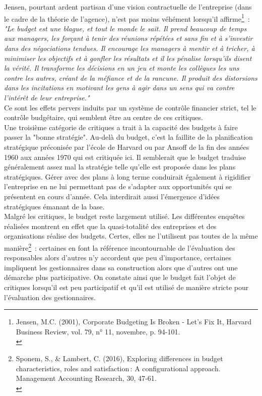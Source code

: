 \documentclass{kaobook}
\begin{document}
Jensen, pourtant ardent partisan d'une vision contractuelle de l'entreprise (dans le cadre de la théorie de l'agence), n'est pas moins véhément lorsqu'il affirme\footnote{Jensen, M.C. (2001), Corporate Budgeting Is Broken - Let's Fix It, Harvard Business Review, vol. 79, n° 11, novembre, p. 94-101.\\} :\\
\emph{"Le budget est une blague, et tout le monde le sait. Il prend beaucoup de temps aux managers, les forçant à tenir des réunions répétées et sans fin et à s'investir dans des négociations tendues. Il encourage les managers à mentir et à tricher, à minimiser les objectifs et à gonfler les résultats et il les pénalise lorsqu'ils disent la vérité. Il transforme les décisions en un jeu et monte les collègues les uns contre les autres, créant de la méfiance et de la rancune. Il produit des distorsions dans les incitations en motivant les gens à agir dans un sens qui va contre l'intérêt de leur entreprise."}\\
Ce sont les effets pervers induits par un système de contrôle financier strict, tel le contrôle budgétaire, qui semblent être au centre de ces critiques.\\

Une troisième catégorie de critiques a trait à la capacité des budgets à faire passer la "bonne stratégie". Au-delà du budget, c'est la faillite de la planification stratégique préconisée par l'école de Harvard ou par Ansoff de la fin des années 1960 aux années 1970 qui est critiquée ici. Il semblerait que le budget traduise généralement assez mal la stratégie telle qu'elle est proposée dans les plans stratégiques. Gérer avec des plans à long terme conduirait également à rigidifier l'entreprise en ne lui permettant pas de s'adapter aux opportunités qui se présentent en cours d'année. Cela interdirait aussi l'émergence d'idées stratégiques émanant de la base.\\

Malgré les critiques, le budget reste largement utilisé. Les différentes enquêtes réalisées montrent en effet que la quasi-totalité des entreprises et des organisations réalise des budgets. Certes, elles ne l'utilisent pas toutes de la même manière\footnote{Sponem, S., \& Lambert, C. (2016), Exploring differences in budget characteristics, roles and satisfaction : A configurational approach. Management Accounting Research, 30, 47‑61.\\} : certaines en font la référence incontournable de l'évaluation des responsables alors d'autres n'y accordent que peu d'importance, certaines impliquent les gestionnaires dans sa construction alors que d'autres ont une démarche plus participative. On constate ainsi que le budget fait l'objet de critiques lorsqu'il est peu participatif et qu'il est utilisé de manière stricte pour l'évaluation des gestionnaires.\\
\end{document}
